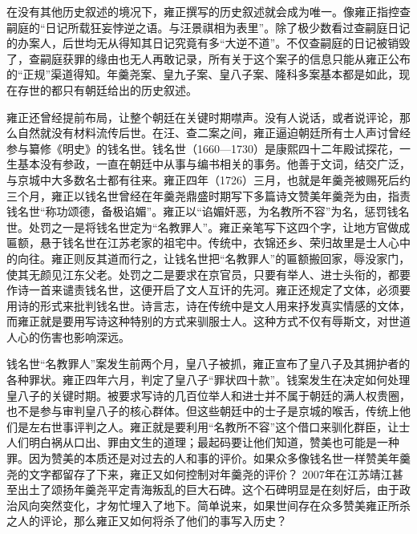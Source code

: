 
在没有其他历史叙述的境况下，雍正撰写的历史叙述就会成为唯一。像雍正指控查嗣庭的“日记所载狂妄悖逆之语。与汪景祺相为表里”。除了极少数看过查嗣庭日记的办案人，后世均无从得知其日记究竟有多“大逆不道”。不仅查嗣庭的日记被销毁了，查嗣庭获罪的缘由也无人再敢记录，所有关于这个案子的信息只能从雍正公布的“正规”渠道得知。年羹尧案、皇九子案、皇八子案、隆科多案基本都是如此，现在存世的都只有朝廷给出的历史叙述。



雍正还曾经提前布局，让整个朝廷在关键时期噤声。没有人说话，或者说评论，那么自然就没有材料流传后世。在汪、查二案之间，雍正逼迫朝廷所有士人声讨曾经参与纂修《明史》的钱名世。钱名世（1660—1730）是康熙四十二年殿试探花，一生基本没有参政，一直在朝廷中从事与编书相关的事务。他善于文词，结交广泛，与京城中大多数名士都有往来。雍正四年（1726）三月，也就是年羹尧被赐死后约三个月，雍正以钱名世曾经在年羹尧鼎盛时期写下多篇诗文赞美年羹尧为由，指责钱名世“称功颂德，备极谄媚”。雍正以“谄媚奸恶，为名教所不容”为名，惩罚钱名世。处罚之一是将钱名世定为“名教罪人”。雍正亲笔写下这四个字，让地方官做成匾额，悬于钱名世在江苏老家的祖宅中。传统中，衣锦还乡、荣归故里是士人心中的向往。雍正则反其道而行之，让钱名世把“名教罪人”的匾额搬回家，辱没家门，使其无颜见江东父老。处罚之二是要求在京官员，只要有举人、进士头衔的，都要作诗一首来谴责钱名世，这便开启了文人互讦的先河。雍正还规定了文体，必须要用诗的形式来批判钱名世。诗言志，诗在传统中是文人用来抒发真实情感的文体，而雍正就是要用写诗这种特别的方式来驯服士人。这种方式不仅有辱斯文，对世道人心的伤害也影响深远。



钱名世“名教罪人”案发生前两个月，皇八子被抓，雍正宣布了皇八子及其拥护者的各种罪状。雍正四年六月，判定了皇八子“罪状四十款”。钱案发生在决定如何处理皇八子的关键时期。被要求写诗的几百位举人和进士并不属于朝廷的满人权贵圈，也不是参与审判皇八子的核心群体。但这些朝廷中的士子是京城的喉舌，传统上他们是左右世事评判之人。雍正就是要利用“名教所不容”这个借口来驯化群臣，让士人们明白祸从口出、罪由文生的道理；最起码要让他们知道，赞美也可能是一种罪。因为赞美的本质还是对过去的人和事的评价。如果众多像钱名世一样赞美年羹尧的文字都留存了下来，雍正又如何控制对年羹尧的评价？ 2007年在江苏靖江甚至出土了颂扬年羹尧平定青海叛乱的巨大石碑。这个石碑明显是在刻好后，由于政治风向突然变化，才匆忙埋入了地下。简单说来，如果世间存在众多赞美雍正所杀之人的评论，那么雍正又如何将杀了他们的事写入历史？



